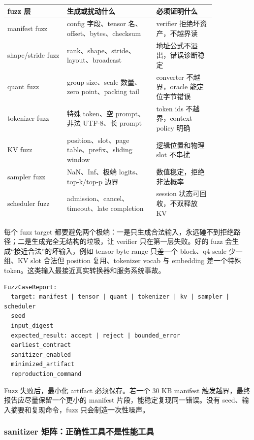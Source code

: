 \begin{center}
\small
\begin{tabular}{p{0.24\linewidth}p{0.36\linewidth}p{0.24\linewidth}}
\toprule
fuzz 层 & 生成或扰动什么 & 必须证明什么 \\
\midrule
manifest fuzz & config 字段、tensor 名、offset、bytes、checksum & verifier 拒绝坏资产，不越界读 \\
shape/stride fuzz & rank、shape、stride、layout、broadcast & 地址公式不溢出，错误诊断稳定 \\
quant fuzz & group size、scale 数量、zero point、packing tail & converter 不越界，oracle 能定位字节错误 \\
tokenizer fuzz & 特殊 token、空 prompt、非法 UTF-8、长 prompt & token ids 不越界，context policy 明确 \\
KV fuzz & position、slot、page table、prefix、sliding window & 逻辑位置和物理 slot 不串扰 \\
sampler fuzz & NaN、Inf、极端 logits、top-k/top-p 边界 & 数值稳定，拒绝非法概率 \\
scheduler fuzz & admission、cancel、timeout、late completion & session 状态可回收，不双释放 KV \\
\bottomrule
\end{tabular}
\end{center}

每个 fuzz target 都要避免两个极端：一是只生成合法输入，永远碰不到拒绝路径；二是生成完全无结构的垃圾，让 verifier 只在第一层失败。好的 fuzz 会生成“接近合法”的坏输入，例如 tensor byte range 只差一个 block、q4 scale 少一组、KV slot 合法但 position 复用、tokenizer vocab 与 embedding 差一个特殊 token。这类输入最接近真实转换器和服务系统事故。

\begin{lstlisting}[numbers=none,caption={fuzz target 的报告字段}]
FuzzCaseReport:
  target: manifest | tensor | quant | tokenizer | kv | sampler | scheduler
  seed
  input_digest
  expected_result: accept | reject | bounded_error
  earliest_contract
  sanitizer_enabled
  minimized_artifact
  reproduction_command
\end{lstlisting}

Fuzz 失败后，最小化 artifact 必须保存。若一个 30 KB manifest 触发越界，最终报告应尽量保留一个更小的 manifest 片段，能稳定复现同一错误。没有 seed、输入摘要和复现命令，fuzz 只会制造一次性噪声。

\subsubsection{sanitizer 矩阵：正确性工具不是性能工具}

